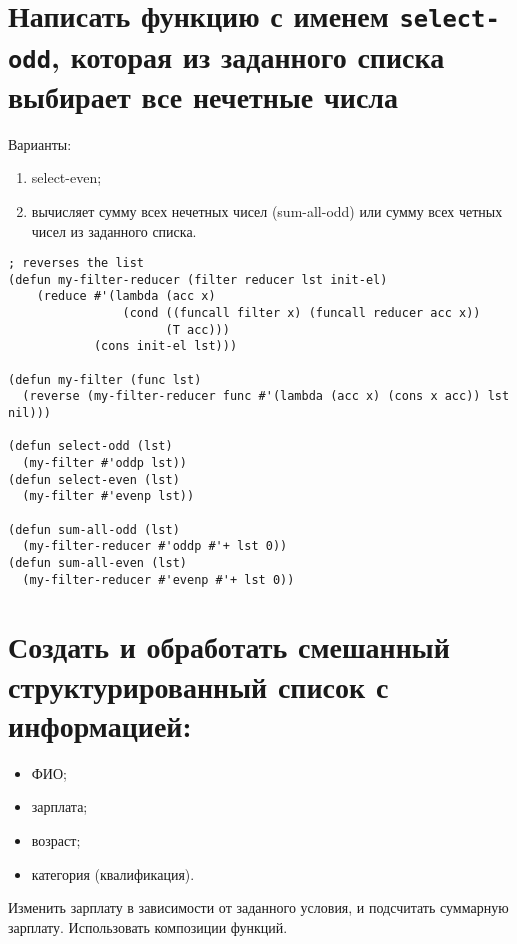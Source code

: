 \section{Написать функцию с именем \texttt{select-odd}, которая из заданного списка выбирает все нечетные числа}

Варианты:
\begin{enumerate}
    \item select-even;
    \item вычисляет сумму всех нечетных чисел (sum-all-odd) или сумму всех четных чисел из заданного списка.
\end{enumerate}

\begin{lstlisting}
; reverses the list
(defun my-filter-reducer (filter reducer lst init-el)
    (reduce #'(lambda (acc x)
                (cond ((funcall filter x) (funcall reducer acc x))
                      (T acc)))
            (cons init-el lst)))

(defun my-filter (func lst)
  (reverse (my-filter-reducer func #'(lambda (acc x) (cons x acc)) lst nil)))

(defun select-odd (lst)
  (my-filter #'oddp lst))
(defun select-even (lst)
  (my-filter #'evenp lst))

(defun sum-all-odd (lst)
  (my-filter-reducer #'oddp #'+ lst 0))
(defun sum-all-even (lst)
  (my-filter-reducer #'evenp #'+ lst 0))
\end{lstlisting}


\section{Создать и обработать смешанный структурированный список с информацией:}


\begin{itemize}
    \item ФИО;
    \item зарплата;
    \item возраст;
    \item категория (квалификация).
\end{itemize}

Изменить зарплату в зависимости от заданного условия, и подсчитать суммарную зарплату. Использовать композиции функций.
